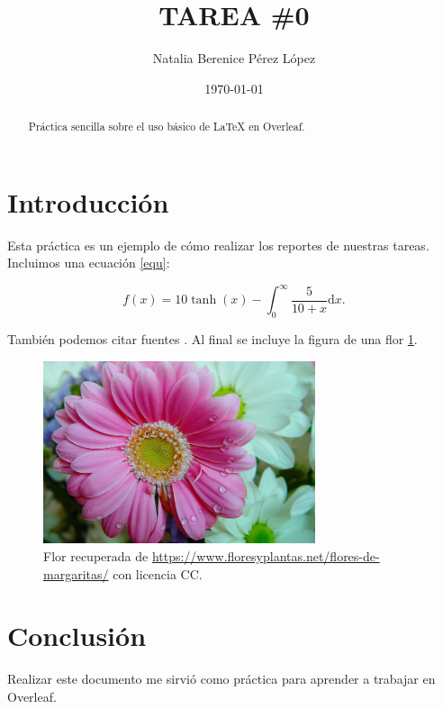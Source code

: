 \documentclass{article}
\title{TAREA \#0} %
\author{Natalia Berenice P\'{e}rez L\'{o}pez} %
\date{\today}
\begin{document}

\maketitle %

\begin{abstract} %
  Pr\'{a}ctica sencilla sobre el uso b\'{a}sico de \LaTeX{} en Overleaf.
\end{abstract}
\section{Introducci\'{o}n}\label{intro} %
Esta pr\'{a}ctica es un ejemplo de c\'{o}mo realizar los reportes de nuestras tareas. Incluimos una ecuaci\'{o}n \eqref{equ}:

\begin{equation}
  f(x) = 10 \tanh(x) - \int_0^\infty \frac{5}{10 + x} \text{d}x.
  \label{equ}
\end{equation}

Tambi\'{e}n podemos citar fuentes \citep{ejemplo} \citep{otroejemplo}. Al final se incluye la figura de una flor \ref{flor}.

\begin{figure} %
    \centering
    \includegraphics[width=80mm]{flor.jpg} %
    \caption{Flor recuperada de \url{https://www.floresyplantas.net/flores-de-margaritas/} con licencia CC.}
    \label{flor}
\end{figure}

\section{Conclusi\'{o}n}
Realizar este documento me sirvi\'{o} como pr\'{a}ctica para aprender a trabajar en Overleaf.



\end{document}
